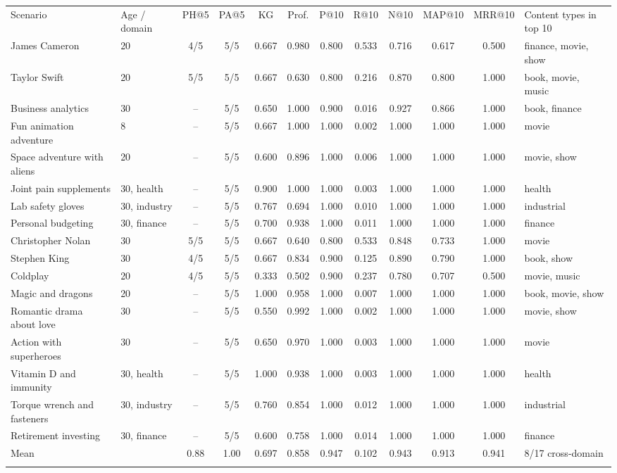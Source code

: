 \setlength{\tabcolsep}{3pt}
\begin{tabular*}{\hsize}{@{\extracolsep{\fill}}llcccccccccl@{}}
\toprule
Scenario & Age / domain & PH@5 & PA@5 & KG & Prof. & P@10 & R@10 & N@10 & MAP@10 & MRR@10 & Content types in top 10 \\
\colrule
James Cameron & 20 & 4/5 & 5/5 & 0.667 & 0.980 & 0.800 & 0.533 & 0.716 & 0.617 & 0.500 & finance, movie, show \\
Taylor Swift & 20 & 5/5 & 5/5 & 0.667 & 0.630 & 0.800 & 0.216 & 0.870 & 0.800 & 1.000 & book, movie, music \\
Business analytics & 30 & -- & 5/5 & 0.650 & 1.000 & 0.900 & 0.016 & 0.927 & 0.866 & 1.000 & book, finance \\
Fun animation adventure & 8 & -- & 5/5 & 0.667 & 1.000 & 1.000 & 0.002 & 1.000 & 1.000 & 1.000 & movie \\
Space adventure with aliens & 20 & -- & 5/5 & 0.600 & 0.896 & 1.000 & 0.006 & 1.000 & 1.000 & 1.000 & movie, show \\
Joint pain supplements & 30, health & -- & 5/5 & 0.900 & 1.000 & 1.000 & 0.003 & 1.000 & 1.000 & 1.000 & health \\
Lab safety gloves & 30, industry & -- & 5/5 & 0.767 & 0.694 & 1.000 & 0.010 & 1.000 & 1.000 & 1.000 & industrial \\
Personal budgeting & 30, finance & -- & 5/5 & 0.700 & 0.938 & 1.000 & 0.011 & 1.000 & 1.000 & 1.000 & finance \\
Christopher Nolan & 30 & 5/5 & 5/5 & 0.667 & 0.640 & 0.800 & 0.533 & 0.848 & 0.733 & 1.000 & movie \\
Stephen King & 30 & 4/5 & 5/5 & 0.667 & 0.834 & 0.900 & 0.125 & 0.890 & 0.790 & 1.000 & book, show \\
Coldplay & 20 & 4/5 & 5/5 & 0.333 & 0.502 & 0.900 & 0.237 & 0.780 & 0.707 & 0.500 & movie, music \\
Magic and dragons & 20 & -- & 5/5 & 1.000 & 0.958 & 1.000 & 0.007 & 1.000 & 1.000 & 1.000 & book, movie, show \\
Romantic drama about love & 30 & -- & 5/5 & 0.550 & 0.992 & 1.000 & 0.002 & 1.000 & 1.000 & 1.000 & movie, show \\
Action with superheroes & 30 & -- & 5/5 & 0.650 & 0.970 & 1.000 & 0.003 & 1.000 & 1.000 & 1.000 & movie \\
Vitamin D and immunity & 30, health & -- & 5/5 & 1.000 & 0.938 & 1.000 & 0.003 & 1.000 & 1.000 & 1.000 & health \\
Torque wrench and fasteners & 30, industry & -- & 5/5 & 0.760 & 0.854 & 1.000 & 0.012 & 1.000 & 1.000 & 1.000 & industrial \\
Retirement investing & 30, finance & -- & 5/5 & 0.600 & 0.758 & 1.000 & 0.014 & 1.000 & 1.000 & 1.000 & finance \\
\colrule
Mean &  & 0.88 & 1.00 & 0.697 & 0.858 & 0.947 & 0.102 & 0.943 & 0.913 & 0.941 & 8/17 cross-domain \\
\botrule
\end{tabular*}
